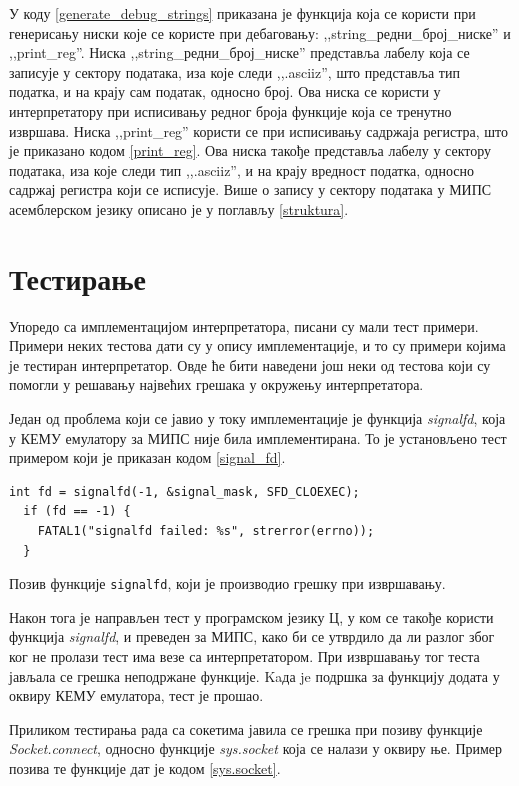 \documentclass[12pt,oneside]{memoir}
\begin{document}
У коду \ref{generate_debug_strings} приказана је функција која се користи при генерисању ниски које се користе при дебаговању: ,,string\_редни\_број\_ниске'' и ,,print\_reg''. Ниска  ,,string\_редни\_број\_ниске'' представља лабелу која се записује у сектору података, иза које следи ,,.asciiz'', што представља тип податка, и на крају сам податак, односно број. Ова ниска се користи у интерпретатору при исписивању редног броја функције која се тренутно извршава.
Ниска ,,print\_reg'' користи се при исписивању садржаја регистра, што је приказано кодом \ref{print_reg}. Ова ниска такође представља лабелу у сектору података, иза које следи тип ,,.asciiz'', и на крају вредност податка, односно садржај регистра који се исписује. Више о запису у сектору података у МИПС асемблерском језику описано је у поглављу \ref{struktura}.

\section{Тестирање}
\label{testiranje}
Упоредо са имплементацијом интерпретатора, писани су мали тест примери. Примери неких тестова дати су у опису имплементације, и то су примери којима је тестиран интерпретатор. Овде ће бити наведени још неки од тестова који су помогли у решавању највећих грешака у окружењу интерпретатора.

Један од проблема који се јавио у току имплементације је функција \textit{signalfd}, која у КЕМУ емулатору за МИПС није била имплементирана. То је установљено тест примером који је приказан кодом \ref{signal_fd}.\\

\begin{listing}
\begin{verbatim}
int fd = signalfd(-1, &signal_mask, SFD_CLOEXEC);
  if (fd == -1) {
    FATAL1("signalfd failed: %s", strerror(errno));
  }
\end{verbatim}
\caption{Позив функције \texttt{signalfd}, који је производио грешку при извршавању.}
\label{signal_fd}
\end{listing}

Након тога је направљен тест у програмском језику Ц, у ком се такође користи функција \textit{signalfd}, и преведен за МИПС, како би се утврдило да ли разлог због ког не пролази тест има везе са интерпретатором. При извршавању тог теста јављала се грешка неподржане функције. Kaда je подршка за функцију додата у оквиру КЕМУ емулатора, тест је прошао.

Приликом тестирања рада са сокетима јавила се грешка при позиву функције \textit{Socket.connect}, односно функције \textit{sys.socket} која се налази у оквиру ње. Пример позива те функције дат је кодом \ref{sys.socket}.\\
\end{document}
